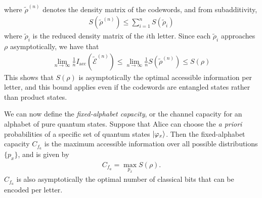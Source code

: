\documentclass[a4paper, 12pt]{article}
\numberwithin{equation}{section}
\numberwithin{figure}{section}
\theoremstyle{definition}
\begin{document}
    where $\tilde{\rho}^{(n)}$ denotes the density matrix of the codewords, and from subadditivity,
    \begin{align}
        S \left( \tilde{\rho}^{(n)} \right) \leq \sum_{i = 1}^n S(\tilde{\rho}_i)
    \end{align}
    where $\tilde{\rho}_i$ is the reduced density matrix of the $i$th letter. Since each $\tilde{\rho}_i$ approaches $\rho$ asymptotically, we have that
    \begin{align}
        \lim_{n \to \infty} \frac{1}{n} I_\text{acc} \left( \tilde{\mathcal{E}}^{(n)} \right) \leq \lim_{n \to \infty} \frac{1}{n} S \left( \tilde{\rho}^{(n)} \right) \leq S(\rho)
    \end{align}
    This shows that $S(\rho)$ is asymptotically the optimal accessible information per letter, and this bound applies even if the codewords are entangled states rather than product states. \par
    We can now define the \textit{fixed-alphabet capacity}, or the channel capacity for an alphabet of pure quantum states. Suppose that Alice can choose the \textit{a priori} probabilities of a specific set of quantum states $\ket{\varphi_x}$. Then the fixed-alphabet capacity $C_{f_a}$ is the maximum accessible information over all possible distributions $\{ p_x \}$, and is given by
    \begin{align}
        C_{f_a} = \max_{p_x} S(\rho).
    \end{align}
    $C_{f_a}$ is also asymptotically the optimal number of classical bits that can be encoded per letter.
\end{document}
